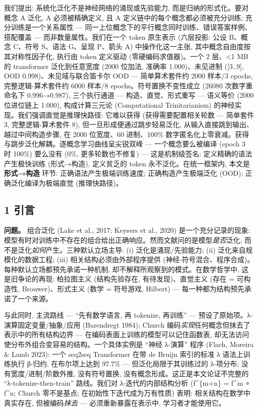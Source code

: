 \documentclass[
]{article}
\begin{document}
我们提出: 系统化泛化不是神经网络的涌现或先验能力,
而是归纳的形式化。要对概念 A 泛化, A 必须被精确定义, 且 A
定义链中的每个概念都必须被充分训练; 充分训练是一个关系属性 ---
同一上位概念下的平行概念同时训练、错误答案样例、搭配覆盖 ---
而非数量属性。我们在一个 token 原生表示 (六层投影: 公设 B、概念 C、符号
S、语法 G、呈现 P、箭头 A) 中操作化这一主张,
其中概念自由度按其对称性因子化, 执行由 token 定义驱动
(零硬编码求值器)。一个 2 层、\textless1 MB 的 transformer 泛化到任意宽度
(2000 位加法, 准确率 1.000)、未见进制 ({[}3..9{]}, OOD
0.998)、未见域与联合笛卡尔 OOD --- 简单算术套件约 2000 样本/3 epochs,
完整逻辑-算术套件约 6000 样本/8 epochs。符号置换不变性成立 (26080
次数字重命名下 0.996→0.987), 三个执行通道 --- 构造、直觉、形式重写 ---
语义等价 (2000 位进位链上 1.000), 构成计算三元论 (Computational
Trinitarianism) 的神经实现。我们强调直觉是推理快路径: 它难以获得
(获得需要配置相关轮数 --- 简单套件 3, 完整逻辑-算术套件 8),
但一旦形成便通过跳步轻易泛化, 从输入直接跳到输出、越过中间构造步骤, 在
2000 位宽度、60 进制、100\%
数字匿名化上零衰减。获得与跳步泛化解耦。逐概念学习曲线呈尖锐双峰 ---
一个概念要么被编译 (epoch 3 时 100\%) 要么没有 (0\%, 更多轮数也不修复)
--- 这是机制级签名: 定义精确的语法产生极快训练 (形式→构造), 定义贫乏的
token 永不泛化。在统一框架内, 本文是 \textbf{形式→构造} 环节:
正确语法产生极端训练速度; 正确构造产生极端泛化 (OOD);
正确泛化编译为极端直觉 (推理快路径)。

\subsection{1 引言}\label{ux5f15ux8a00}

\textbf{问题。} 组合泛化 (Lake et al., 2017; Keysers et al., 2020)
是一个充分记录的现象:
模型有时对训练中不存在的组合给出正确响应。然而文献问的是模型\emph{是否}泛化,
而不是泛化\emph{如何}产生。三种默认立场主导: (i) 泛化是涌现/先验能力;
(ii) 泛化来自规模化的数据工程; (iii) 相关结构必须由外部程序提供
(神经-符号混合、程序合成)。每种默认立场都预先承诺一种机制,
却不解释所观察到的模式。在数学哲学中, 这是旧争论的再现: 柏拉图主义
(结构先验存在, 有待发现)、直觉主义 (存在 = 可构造性, Brouwer)、形式主义
(数学 = 符号游戏, Hilbert) --- 每一种都为结构预先承诺了一个来源。

与此同时, 主流路线 --- ``先有数学语言, 再 tokenize, 再训练'' ---
预设了原始项。λ-演算固定变量/抽象/应用 (Barendregt 1984); Church
编码\emph{实现}任何概念但抹去了表示中的所有结构边界 ---
在编码表面上训练的模型可以记住函数表,
却无法访问使分布外组合变容易的结构。一个具体实例是 ``神经 λ-演算'' 程序
(Flach, Moreira \& Lamb 2023): 一个 seq2seq Transformer 在带 de Bruijn
索引的标准 λ 语法上训练执行 β-归约, 在布尔项上达到 97.7\% ---
但泛化局限于其训练过的 λ-项分布; 没有宽度/进制/阶数外推, 没有符号置换,
没有概念形成。这正是本文论证不完整的 ``λ-tokenize-then-train''
路线。我们对 λ-迭代的内部结构分析 (f\^{}\{m+n\} = f\^{}m ∘ f\^{}n;
Church 零不是基点; 在初始性下迭代成为万有性质) 表明:
相关结构在数学中真实存在, 但被编码\emph{抹去} --- 必须重新暴露在表示中,
学习者才能使用它。
\end{document}
